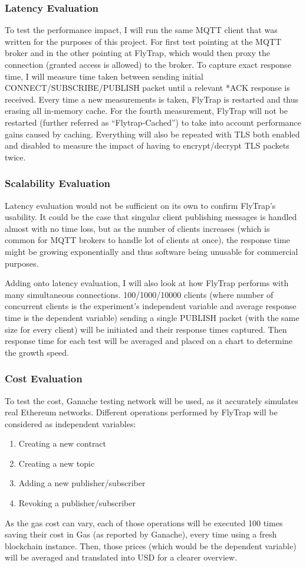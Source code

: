 \subsubsection{Latency Evaluation} To test the performance impact, I will run the same MQTT client that was written for the purposes of this project. For first test pointing at the MQTT broker and in the other pointing at FlyTrap, which would then proxy the connection (granted access is allowed) to the broker. To capture exact response time, I will measure time taken between sending initial CONNECT/SUBSCRIBE/PUBLISH packet until a relevant *ACK response is received. Every time a new measurements is taken, FlyTrap is restarted and thus erasing all in-memory cache. For the fourth measurement, FlyTrap will not be restarted (further referred as ``Flytrap-Cached'') to take into account performance gains caused by caching. Everything will also be repeated with TLS both enabled and disabled to measure the impact of having to encrypt/decrypt TLS packets twice.
\subsubsection{Scalability Evaluation}
Latency evaluation would not be sufficient on its own to confirm FlyTrap's usability. It could be the case that singular client publishing messages is handled almost with no time loss, but as the number of clients increases (which is common for MQTT brokers to handle lot of clients at once), the response time might be growing exponentially and thus software being unusable for commercial purposes. 

Adding onto latency evaluation, I will also look at how FlyTrap performs with many simultaneous connections. 100/1000/10000 clients (where number of concurrent clients is the experiment's independent variable and average response time is the dependent variable) sending a single PUBLISH packet (with the same size for every client) will be initiated and their response times captured. Then response time for each test will be averaged and placed on a chart to determine the growth speed.  
\subsubsection{Cost Evaluation}
To test the cost, Ganache testing network will be used, as it accurately simulates real Ethereum networks. Different operations performed by FlyTrap will be considered as independent variables:
\begin{enumerate}
  \item Creating a new contract
  \item Creating a new topic
  \item Adding a new publisher/subscriber
  \item Revoking a publisher/subscriber
\end{enumerate}
As the gas cost can vary, each of those operations will be executed 100 times saving their cost in Gas (as reported by Ganache), every time using a fresh blockchain instance. Then, those prices (which would be the dependent variable) will be averaged and translated into USD for a clearer overview.
